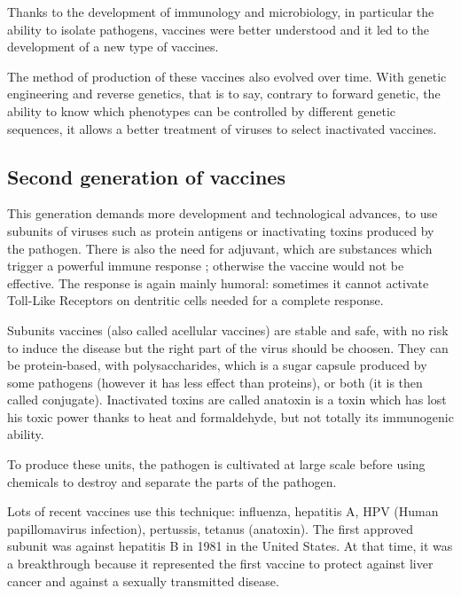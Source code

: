 \documentclass{article}
\begin{document}

            Thanks to the development of immunology and microbiology, in particular the ability to isolate pathogens, vaccines were better understood
                and it led to the development of a new type of vaccines.

            The method of production of these vaccines also evolved over time. With genetic engineering and reverse genetics, that is to say,  
                contrary to forward genetic, the ability to know which phenotypes can be controlled by different genetic sequences,
                it allows a better treatment of viruses to select inactivated vaccines.


        \subsection{Second generation of vaccines}


            This generation demands more development and technological advances,
                to use subunits of viruses such as protein antigens or inactivating toxins produced by the pathogen. %
            There is also the need for adjuvant, which are substances which trigger a powerful immune response ; otherwise the vaccine would not be effective. 
            The response is again mainly humoral: sometimes it cannot activate Toll-Like Receptors on dentritic cells needed for a complete response.

            Subunits vaccines (also called acellular vaccines) are stable and safe, with no risk to induce the disease but the right part of the virus should be choosen.
                They can be protein-based, with polysaccharides, which is a sugar capsule produced by some pathogens (however it has less effect than proteins), or both (it is then called conjugate).
            Inactivated toxins are called anatoxin is a toxin which has lost his toxic power thanks to heat and formaldehyde, but not totally its immunogenic ability.

            To produce these units, the pathogen is cultivated at large scale before using chemicals to destroy and separate the parts of the pathogen.

            Lots of recent vaccines use this technique: influenza, hepatitis A, HPV (Human papillomavirus infection), pertussis, tetanus (anatoxin). 
                The first approved subunit was against hepatitis B in 1981 in the United States. 
                At that time, it was a breakthrough because it represented the first vaccine to protect against liver cancer and against a sexually transmitted disease.
\end{document}
